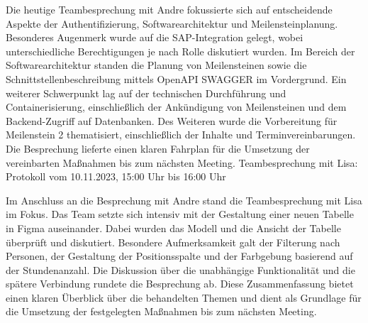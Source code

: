 \documentclass{article}
\begin{document}
Die heutige Teambesprechung mit Andre fokussierte sich auf entscheidende
Aspekte der Authentifizierung, Softwarearchitektur und Meilensteinplanung.
Besonderes Augenmerk wurde auf die SAP-Integration gelegt, wobei
unterschiedliche Berechtigungen je nach Rolle diskutiert wurden. Im Bereich der
Softwarearchitektur standen die Planung von Meilensteinen sowie die
Schnittstellenbeschreibung mittels OpenAPI SWAGGER im Vordergrund. Ein weiterer
Schwerpunkt lag auf der technischen Durchführung und Containerisierung,
einschließlich der Ankündigung von Meilensteinen und dem Backend-Zugriff auf
Datenbanken. Des Weiteren wurde die Vorbereitung für Meilenstein 2
thematisiert, einschließlich der Inhalte und Terminvereinbarungen. Die
Besprechung lieferte einen klaren Fahrplan für die Umsetzung der vereinbarten
Maßnahmen bis zum nächsten Meeting. Teambesprechung mit Lisa: Protokoll vom
10.11.2023, 15:00 Uhr bis 16:00 Uhr

Im Anschluss an die Besprechung mit Andre stand die Teambesprechung mit Lisa im
Fokus. Das Team setzte sich intensiv mit der Gestaltung einer neuen Tabelle in
Figma auseinander. Dabei wurden das Modell und die Ansicht der Tabelle
überprüft und diskutiert. Besondere Aufmerksamkeit galt der Filterung nach
Personen, der Gestaltung der Positionsspalte und der Farbgebung basierend auf
der Stundenanzahl. Die Diskussion über die unabhängige Funktionalität und die
spätere Verbindung rundete die Besprechung ab. Diese Zusammenfassung bietet
einen klaren Überblick über die behandelten Themen und dient als Grundlage für
die Umsetzung der festgelegten Maßnahmen bis zum nächsten Meeting.

\newpage



\end{document}
